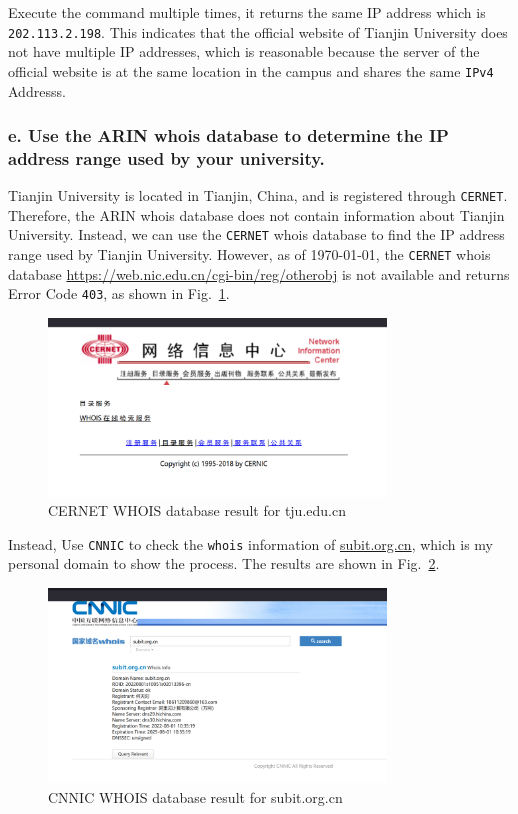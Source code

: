 \documentclass{cshwk}
\begin{document}
Execute the command multiple times, it returns the same IP address which is \texttt{202.113.2.198}. This indicates that the official website of Tianjin University does not have multiple IP addresses, which is reasonable because the server of the official website is at the same location in the campus and shares the same \texttt{IPv4} Addresss.

\subsubsection*{e. Use the ARIN whois database to determine the IP address range used by your university.}

Tianjin University is located in Tianjin, China, and is registered through \texttt{CERNET}. Therefore, the ARIN whois database does not contain information about Tianjin University. Instead, we can use the \texttt{CERNET} whois database to find the IP address range used by Tianjin University. However, as of \today, the \texttt{CERNET} whois database \url{https://web.nic.edu.cn/cgi-bin/reg/otherobj} is not available and returns Error Code \texttt{403}, as shown in Fig.~\ref{fig:whois-cernet}.

\begin{figure}[htbp]
    \centering
    \includegraphics[width=0.8\textwidth]{hw2-1-7.png}
    \caption{CERNET WHOIS database result for tju.edu.cn}
    \label{fig:whois-cernet}
\end{figure}

Instead, Use \texttt{CNNIC} to check the \texttt{whois} information of \href{https://subit.org.cn}{subit.org.cn}, which is my personal domain to show the process. The results are shown in Fig.~\ref{fig:whois-cnnic}.

\begin{figure}[htbp]
    \centering
    \includegraphics[width=0.8\textwidth]{hw2-1-8.png}
    \caption{CNNIC WHOIS database result for subit.org.cn}
    \label{fig:whois-cnnic}
\end{figure}
\end{document}
